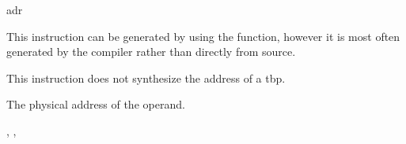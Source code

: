 \begin{instruction}{adr}

  \begin{notes}
    This instruction can be generated by using the 
    function, however it is most often generated by the compiler
    rather than directly from source.

    This instruction does not synthesize the address of a \ac{tbp}.
  \end{notes}

  \begin{results}
  \item The physical address of the operand.
  \end{results}

  \begin{operands}
  \item {}
  \end{operands}

  \begin{seealso}
    , ,
  \end{seealso}
\end{instruction}

